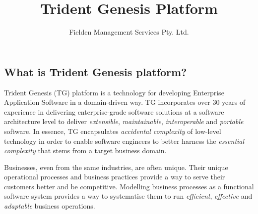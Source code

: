 \documentclass[a4paper,10pt,twocolumn,oneside,openright,final]{memoir}
\title{Trident Genesis Platform}
\author{Fielden Management Services Pty. Ltd.}
\begin{document}

\subsection*{What is Trident Genesis platform?}
  Trident Genesis (TG) platform is a technology for developing Enterprise Application Software in a domain-driven way.
  TG incorporates over 30 years of experience in delivering enterprise-grade software solutions at a software architecture level to deliver \emph{extensible}, \emph{maintainable}, \emph{interoperable} and \emph{portable} software.
  In essence, TG encapsulates \emph{accidental complexity} of low-level technology in order to enable software engineers to better harness the
  \emph{essential complexity} that stems from a target business domain.

  \vspace{3 mm}
  \noindent Businesses, even from the same industries, are often unique.
  Their unique operational processes and business practices provide a way to serve their customers better and be competitive.
  Modelling business processes as a functional software system provides a way to systematise them to run \emph{efficient}, \emph{effective} and \emph{adaptable} business operations.

\begin{figure}[!h]
    \vspace{-5pt}
    \centering
    \vspace{0pt}
  \end{figure}
\end{document}
